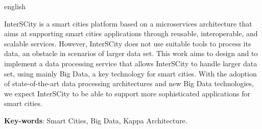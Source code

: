 \begin{resumo}[Abstract]
 \begin{otherlanguage*}{english}

     InterSCity is a smart cities platform based on a microservices
     architecture that aims at supporting smart cities applications through
     reusable, interoperable, and scalable services.
     However, InterSCity does not use suitable tools to process its data, an
     obstacle in scenarios of larger data set. This work aims to design and to
     implement a data processing service that allows InterSCity to handle
     larger data set, using mainly Big Data, a key technology for smart cities.
     With the adoption of state-of-the-art data processing architectures and
     new Big Data technologies, we expect InterSCity to be able to support more
     sophisticated applications for smart cities.

   \vspace{\onelineskip}
 
   \noindent 
   \textbf{Key-words}: Smart Cities, Big Data, Kappa Architecture.
 \end{otherlanguage*}
\end{resumo}
